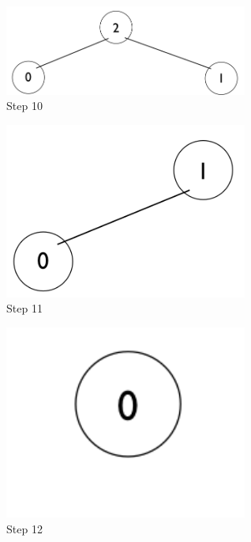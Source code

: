 \documentclass[11pt,letterpaper]{article}
\begin{document}
\begin{figure}[!ht]

	\begin{center}
	\includegraphics[width=80mm]{images/6_5_1_10_tree.png}
	\end{center}

\caption{Step 10 }
\end{figure}

\pagebreak

\begin{figure}[!ht]

	\begin{center}
	\includegraphics[width=80mm]{images/6_5_1_11_tree.png}
	\end{center}

\caption{Step 11 }
\end{figure}

\begin{figure}[!ht]

	\begin{center}
	\includegraphics[width=80mm]{images/6_5_1_12_tree.png}
	\end{center}

\caption{Step 12 }
\end{figure}
\end{document}

